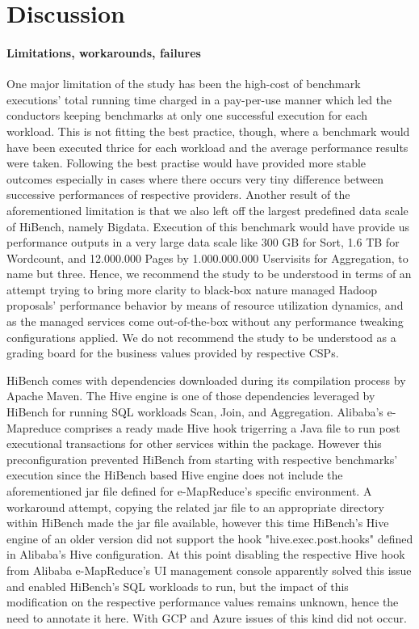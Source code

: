 \documentclass[review]{elsarticle}
\begin{document}
\section{Discussion}
\paragraph{Limitations, workarounds, failures}One major limitation of the study has been the high-cost of benchmark executions' total running time charged in a pay-per-use manner which led the conductors keeping benchmarks at only one successful execution for each workload. This is not fitting the best practice, though, where a benchmark would have been executed thrice for each workload and the average performance results were taken. Following the best practise would have provided more stable outcomes especially in cases where there occurs very tiny difference between successive performances of respective providers. Another result of the aforementioned limitation is that we also left off the largest predefined data scale of HiBench, namely Bigdata. Execution of this benchmark would have provide us performance outputs in a very large data scale like 300 GB for Sort, 1.6 TB for Wordcount, and 12.000.000 Pages by 1.000.000.000 Uservisits for Aggregation, to name but three. Hence, we recommend the study to be understood in terms of an attempt trying to bring more clarity to black-box nature managed Hadoop proposals' performance behavior by means of resource utilization dynamics, and as the managed services come out-of-the-box without any performance tweaking configurations applied. We do not recommend the study to be understood as a grading board for the business values provided by respective CSPs.

HiBench comes with dependencies downloaded during its compilation process by Apache Maven. The Hive engine is one of those dependencies leveraged by HiBench for running SQL workloads Scan, Join, and Aggregation. Alibaba's e-Mapreduce comprises a ready made Hive hook trigerring a Java file to run post executional transactions for other services within the package. However this preconfiguration prevented HiBench from starting with respective benchmarks' execution since the HiBench based Hive engine does not include the aforementioned jar file defined for e-MapReduce's specific environment. A workaround attempt, copying the related jar file to an appropriate directory within HiBench made the jar file available, however this time HiBench's Hive engine of an older version did not support the hook "hive.exec.post.hooks" defined in Alibaba's Hive configuration. At this point disabling the respective Hive hook from Alibaba e-MapReduce's UI management console apparently solved this issue and enabled HiBench's SQL workloads to run, but the impact of this modification on the respective performance values remains unknown, hence the need to annotate it here. With GCP and Azure issues of this kind did not occur.
\end{document}
